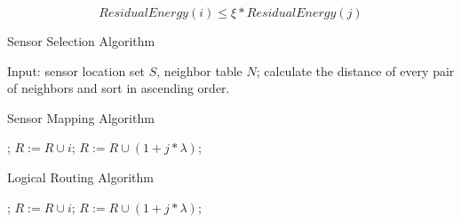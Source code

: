 \documentclass[conference]{IEEEtran}
\begin{document}


$$ResidualEnergy(i) \leq \xi * ResidualEnergy(j)$$

\begin{algorithm}[!h]
\caption{Sensor Selection Algorithm}
\label{RDS}
\begin{algorithmic}[1]
\STATE Input: sensor location set $S$, neighbor table $N$;
\STATE calculate the distance of every pair of neighbors and sort in ascending order.  
	\STATE 
\ENDFOR
\end{algorithmic}
\end{algorithm}


\begin{algorithm}[!h]
\caption{Sensor Mapping Algorithm}
\label{RDS}
\begin{algorithmic}[1]
\STATE ;
	\STATE $R :=R \cup i$; \label{RDSline2}
\ENDFOR
{}
	\STATE $R :=R \cup (1 + j * \lambda )$; \label{RDSline3}
\ENDFOR
\end{algorithmic}
\end{algorithm}

\begin{algorithm}[!h]
\caption{Logical Routing Algorithm}
\label{RDS}
\begin{algorithmic}[1]
\STATE ;
	\STATE $R :=R \cup i$; \label{RDSline2}
\ENDFOR
{}
	\STATE $R :=R \cup (1 + j * \lambda )$; \label{RDSline3}
\ENDFOR
\end{algorithmic}
\end{algorithm}

\end{document}
